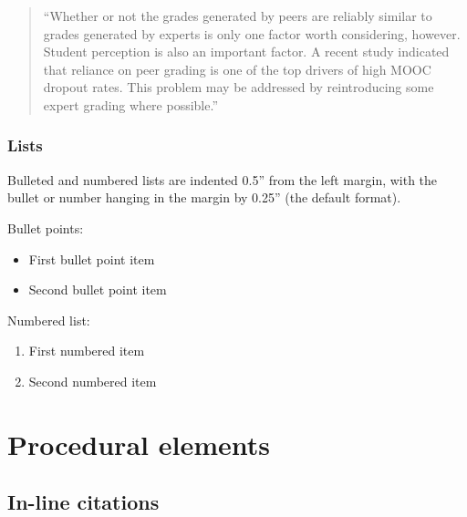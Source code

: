 \documentclass{jdf}
\begin{document}
\begin{quote}
``Whether or not the grades generated by peers are reliably similar to
grades generated by experts is only one factor worth considering,
however. Student perception is also an important factor. A recent study
indicated that reliance on peer grading is one of the top drivers of
high MOOC dropout rates. This problem may be addressed by reintroducing
some expert grading where possible.'' \autocite{joyner2016}
\end{quote}

\hypertarget{lists}{%
\subsubsection{Lists}\label{lists}}

Bulleted and numbered lists are indented 0.5'' from the left margin,
with the bullet or number hanging in the margin by 0.25'' (the default
format).

Bullet points:

\begin{itemize}
\item
  First bullet point item
\item
  Second bullet point item
\end{itemize}

Numbered list:

\begin{enumerate}
\def\labelenumi{\arabic{enumi}.}
\item
  First numbered item
\item
  Second numbered item
\end{enumerate}

\hypertarget{procedural-elements}{%
\section{Procedural elements}\label{procedural-elements}}

\hypertarget{in-line-citations}{%
\subsection{In-line citations}\label{in-line-citations}}
\end{document}
